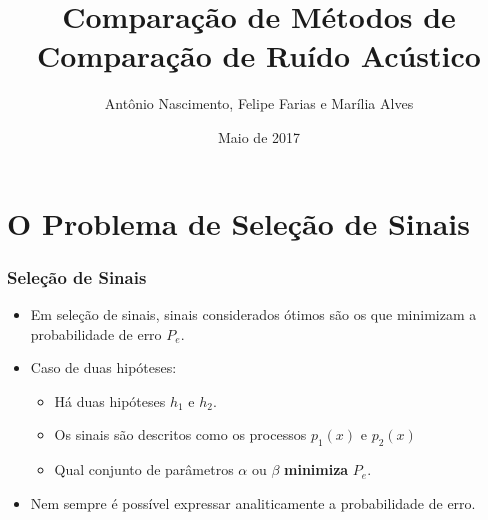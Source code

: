 \documentclass{beamer}
\title[Ciência de Dados]{Comparação de Métodos de Comparação de Ruído Acústico}
\author[Nascimento, Farias, Alves]
{
Antônio Nascimento, Felipe Farias e Marília Alves
}
\institute[Stanford]{%
Stanford University \\
}
\date[Maio de 2017] %
{Maio de 2017}
\begin{document}

\justifying

\begin{frame}
  \titlepage
\end{frame}




\section[Sumário]{}
\begin{frame}
  \tableofcontents
\end{frame}




\section{O Problema de Seleção de Sinais}


\begin{frame}
	\justifying
  	\frametitle{Seleção de Sinais}
  	
  	\begin{itemize}
  		 \setlength\itemsep{1em}
  		\item Em seleção de sinais, sinais considerados ótimos são os que minimizam a probabilidade de erro $P_e$.
  		\item Caso de duas hipóteses:
  		\begin{itemize}
  			\item Há duas hipóteses $h_1$ e $h_2$.
  			\item Os sinais são descritos como os processos $p_1(x)$ e $p_2(x)$
  			\item Qual conjunto de parâmetros $\alpha$ ou $\beta$ \textbf{minimiza} $P_e$.
  		\end{itemize}


  		\item Nem sempre é possível expressar analiticamente a probabilidade de erro.
  		\end{itemize}
\end{frame}
\end{document}
